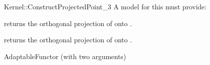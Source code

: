 \begin{ccRefFunctionObjectConcept}{Kernel::ConstructProjectedPoint_3}
A model for this must provide:


       {returns the orthogonal projection of  onto .}

       {returns the orthogonal projection of  onto .}

\ccRefines
AdaptableFunctor (with two arguments)

\ccSeeAlso
{} \\
 \\

\end{ccRefFunctionObjectConcept}
